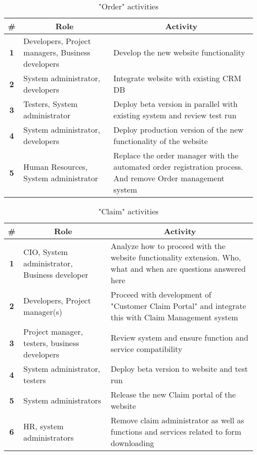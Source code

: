\begin{table}[H]
	\centering
	\begin{tabular}{|c|p{3cm}|p{10.5cm}|}
		\hline
		\textbf{\#} & \multicolumn{1}{c|}{\textbf{Role}} & \multicolumn{1}{c|}{\textbf{Activity}} \\ \hline
		\textbf{1} & Developers, Project managers, Business developers & Develop the new website functionality \\ \hline
		\textbf{2} & System administrator, developers & Integrate website with existing CRM DB\\ \hline
		\textbf{3} & Testers, System administrator  & Deploy beta version in parallel with existing system and review test run \\ \hline
		\textbf{4} & System administrator, developers & Deploy production version of the new functionality of the website \\ \hline
		\textbf{5} & Human Resources, System administrator & Replace the order manager with the automated order registration process. And remove Order management system\\ \hline

	\end{tabular}	
	\caption{"Order" activities}
	\label{table:activities_order}
\end{table}

\begin{table}[H]
	\centering
	\begin{tabular}{|c|p{3cm}|p{10.5cm}|}
		\hline
		\textbf{\#} & \multicolumn{1}{c|}{\textbf{Role}} & \multicolumn{1}{c|}{\textbf{Activity}} \\ \hline
		\textbf{1} & CIO, System administrator, Business developer & Analyze how to proceed with the website functionality extension. Who, what and when are questions answered here  \\ \hline
		\textbf{2} & Developers, Project manager(s) & Proceed with development of "Customer Claim Portal" and integrate this with Claim Management system\\ \hline
		\textbf{3} & Project manager, testers, business developers & Review system and ensure function and service compatibility \\ \hline
		\textbf{4} &System administrator, testers  & Deploy beta version to website and test run \\ \hline
		\textbf{5} & System administrators & Release the new Claim portal of the website\\ \hline
		\textbf{6} & HR, system administrators & Remove claim administrator as well as functions and services related to form downloading\\ \hline
	\end{tabular}	
	\caption{"Claim" activities}
	\label{table:activities_claim}
\end{table}

